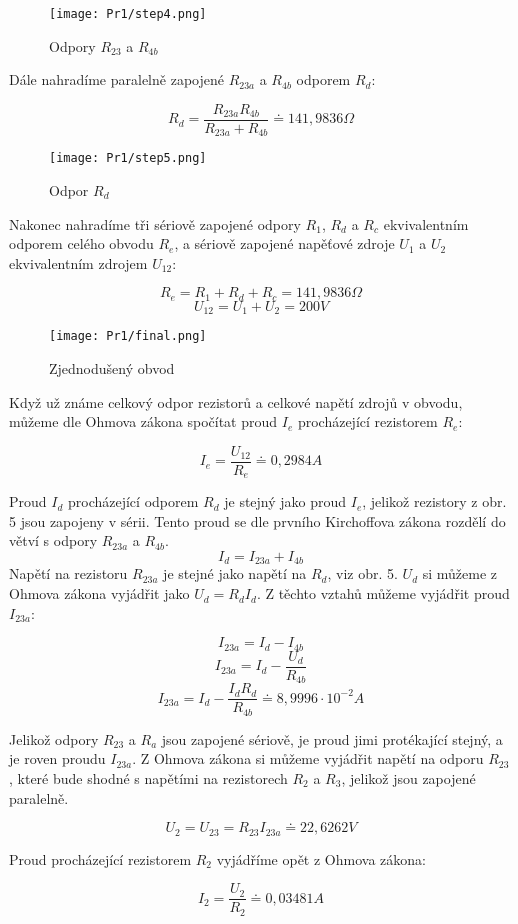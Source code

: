 \begin{figure}[H]
\texttt{[image: Pr1/step4.png]}
\centering
\caption{Odpory $R_{23}$ a $R_{4b}$}
\end{figure}

Dále nahradíme paralelně zapojené $R_{23a}$ a $R_{4b}$ odporem $R_d$:

$$ R_d = \frac{R_{23a}R_{4b}}{R_{23a} + R_{4b}} \doteq 141,9836 \Omega $$

\begin{figure}[H]
\texttt{[image: Pr1/step5.png]}
\centering
\caption{Odpor $R_d$}
\end{figure}

Nakonec nahradíme tři sériově zapojené odpory $R_1$, $R_d$ a $R_c$ ekvivalentním odporem celého 
obvodu $R_e$, a sériově zapojené napěťové zdroje $U_1$ a $U_2$ ekvivalentním zdrojem $U_{12}$:

$$ R_e = R_1 + R_d + R_c = 141,9836 \Omega $$
$$ U_{12} = U_1 + U_2 = 200 V $$

\begin{figure}[H]
\texttt{[image: Pr1/final.png]}
\centering
\caption{Zjednodušený obvod}
\end{figure}

Když už známe celkový odpor rezistorů a celkové napětí zdrojů v obvodu, můžeme dle Ohmova zákona spočítat 
proud $I_e$ procházející rezistorem $R_e$:

$$ I_e = \frac{U_{12}}{R_e} \doteq 0,2984 A $$ 

Proud $I_d$ procházející odporem $R_d$ je stejný jako proud $I_e$, jelikož rezistory z obr. 5 jsou zapojeny v 
sérii. Tento proud se dle prvního Kirchoffova zákona rozdělí do větví s odpory $R_{23a}$ a $R_{4b}$.
$$ I_d = I_{23a} + I_{4b} $$
Napětí na rezistoru $R_{23a}$ je stejné jako napětí na $R_d$, viz obr. 5. $U_d$ si můžeme z Ohmova zákona 
vyjádřit jako $U_d = R_dI_d$. 
Z těchto vztahů můžeme vyjádřit proud $I_{23a}$:

$$ I_{23a} = I_d - I_{4b} $$
$$ I_{23a} = I_d - \frac{U_d}{R_{4b}} $$
$$ I_{23a} = I_d - \frac{I_dR_d}{R_{4b}} \doteq 8,9996 \cdot 10^{-2} A $$

Jelikož odpory $R_{23}$ a $R_a$ jsou zapojené sériově, je proud jimi protékající stejný, a je roven 
proudu $I_{23a}$. Z Ohmova zákona si můžeme vyjádřit napětí na odporu $R_{23}$, které bude shodné s napětími 
na rezistorech $R_2$ a $R_3$, jelikož jsou zapojené paralelně.

$$ U_2 = U_{23} = R_{23}I_{23a} \doteq 22,6262 V $$

Proud procházející rezistorem $R_2$ vyjádříme opět z Ohmova zákona:

$$ I_2 = \frac{U_2}{R_2} \doteq 0,03481 A $$
